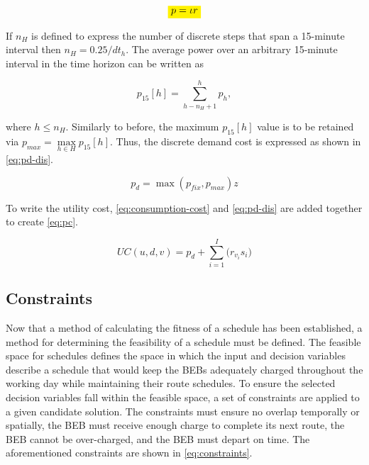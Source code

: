 \documentclass[11pt,a4paper,final]{article}
\newcommand{\mathcolorbox}[1]{\colorbox{yellow}{$\displaystyle #1$}}
\newcommand{\UC}{UC(u, d, v)}               %
\begin{document}
\begin{equation}
\label{eq:discrete-power}
  \mathcolorbox{p = \iota r}
\end{equation}

If \(n_H\) is defined to express the number of discrete steps that span a 15-minute interval then \(n_H = 0.25/dt_h\). The
average power over an arbitrary 15-minute interval in the time horizon can be written as

\begin{equation}
p_{15}[h] = \sum_{h-n_H+1}^h p_h,
\end{equation}

where \(h \le n_H\). Similarly to before, the maximum \(p_{15}[h]\) value is to be retained via \(p_{max} = \max\limits_{h \in
H}p_{15}[h]\). Thus, the discrete demand cost is expressed as shown in \ref{eq:pd-dis}.

\begin{equation}
\label{eq:pd-dis}
  p_d = \max(p_{fix}, p_{max})z
\end{equation}

To write the utility cost, \ref{eq:consumption-cost} and \ref{eq:pd-dis} are added together to create \ref{eq:pc}.

\begin{equation}
\label{eq:pc}
\UC = p_d + \sum_{i=1}^I \Big( r_{v_i}s_i \Big)
\end{equation}

\subsection{Constraints}
\label{sec:constraints}
Now that a method of calculating the fitness of a schedule has been established, a method for determining the
feasibility of a schedule must be defined. The feasible space for schedules defines the space in which the input and
decision variables describe a schedule that would keep the BEBs adequately charged throughout the working day while
maintaining their route schedules. To ensure the selected decision variables fall within the feasible space, a set of
constraints are applied to a given candidate solution. The constraints must ensure no overlap temporally or spatially,
the BEB must receive enough charge to complete its next route, the BEB cannot be over-charged, and the BEB must depart
on time. The aforementioned constraints are shown in \ref{eq:constraints}.
\end{document}
